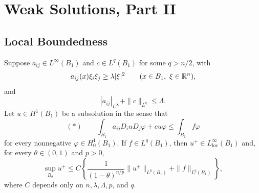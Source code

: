 \chapter{Weak Solutions, Part II}

\section{Local Boundedness}

\begin{theorem}\label{hanlin:weaksol-part2-local-boundedness}
Suppose $a_{ij}\in L^\infty(B_1)$ and $c\in L^q(B_1)$ for some
$q>n/2$, with
\[
a_{ij}(x)\xi_i\xi_j\geq\lambda|\xi|^2
\qquad(x\in B_1,\ \xi\in\mathbb{R}^n),
\]
and
\[
|a_{ij}|_{L^\infty}+\|c\|_{L^q}\leq\Lambda.
\]
Let $u\in H^1(B_1)$ be a subsolution in the sense that
\[
(*)\qquad
\int_{B_1}a_{ij}D_i uD_j\varphi+cu\varphi
\leq\int_{B_1}f\varphi
\]
for every nonnegative $\varphi\in H^1_0(B_1)$. If $f\in L^q(B_1)$,
then $u^+\in L^\infty_{\mathrm{loc}}(B_1)$ and, for every
$\theta\in(0,1)$ and $p>0$,
\[
\sup_{B_\theta}u^+
\leq C\left\{
\frac{1}{(1-\theta)^{n/p}}\|u^+\|_{L^p(B_1)}
+\|f\|_{L^q(B_1)}\right\},
\]
where $C$ depends only on $n,\lambda,\Lambda,p$, and $q$.
\end{theorem}
